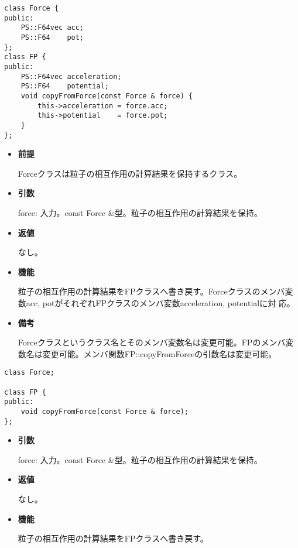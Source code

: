 
\begin{screen}
\begin{verbatim}
class Force {
public:
    PS::F64vec acc;
    PS::F64    pot;
};
class FP {
public:
    PS::F64vec acceleration;
    PS::F64    potential;
    void copyFromForce(const Force & force) {
        this->acceleration = force.acc;
        this->potential    = force.pot;
    }
};
\end{verbatim}
\end{screen}

\begin{itemize}

\item {\bf 前提}

  Forceクラスは粒子の相互作用の計算結果を保持するクラス。

\item {\bf 引数}

  force: 入力。const Force \&型。粒子の相互作用の計算結果を保持。
  
\item {\bf 返値}

  なし。
  
\item {\bf 機能}

  粒子の相互作用の計算結果をFPクラスへ書き戻す。Forceクラスのメンバ変
  数acc, potがそれぞれFPクラスのメンバ変数acceleration, potentialに対
  応。
  
\item {\bf 備考}

  Forceクラスというクラス名とそのメンバ変数名は変更可能。FPのメンバ変
  数名は変更可能。メンバ関数FP::copyFromForceの引数名は変更可能。

\end{itemize}
\fi

\begin{screen}
\begin{verbatim}
class Force;

class FP {
public:
    void copyFromForce(const Force & force);
};
\end{verbatim}
\end{screen}

\begin{itemize}

\item {\bf 引数}

  force: 入力。const Force \&型。粒子の相互作用の計算結果を保持。
  
\item {\bf 返値}

  なし。
  
\item {\bf 機能}

  粒子の相互作用の計算結果をFPクラスへ書き戻す。
  
\end{itemize}


